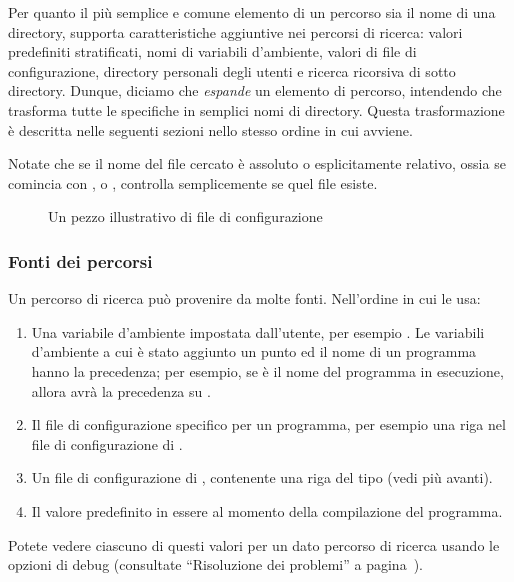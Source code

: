 \documentclass{article}
\begin{document}
Per quanto il più semplice e comune elemento di un percorso sia il nome di
una directory, \KPS{} supporta caratteristiche aggiuntive nei percorsi di
ricerca: valori predefiniti stratificati, nomi di variabili
d'ambiente, valori di file di configurazione, directory personali degli
utenti e ricerca ricorsiva di sotto directory. Dunque, diciamo che \KPS{}
\emph{espande} un elemento di percorso, intendendo che trasforma tutte le
specifiche in semplici nomi di directory. Questa trasformazione è
descritta nelle seguenti sezioni nello stesso ordine in cui avviene.

Notate che se il nome del file cercato è assoluto o esplicitamente relativo,
ossia se comincia con \samp{/},  o , \KPS{} controlla
semplicemente se quel file esiste.

\ifSingleColumn
\else
\begin{figure*}

\setlength{\abovecaptionskip}{0pt}
  \caption{Un pezzo illustrativo di file di configurazione}
  \label{fig:config-sample}
\end{figure*}
\fi

\subsubsection{Fonti dei percorsi}
\label{sec:path-sources}

Un percorso di ricerca può provenire da molte fonti. Nell'ordine in cui
\KPS{} le usa:

\begin{enumerate}
\item
  Una variabile d'ambiente impostata dall'utente, per esempio
  \@. Le variabili d'ambiente a cui è stato aggiunto un
  punto ed il nome di un programma hanno la precedenza; per esempio, se
   è il nome del programma in esecuzione, allora
   avrà la precedenza su .
\item
  Il file di configurazione specifico per un programma, per esempio una
  riga  nel file di configurazione  di
  .
\item
  Un file di configurazione  di \KPS, contenente una riga
  del tipo  (vedi più avanti).
\item Il valore predefinito in essere al momento della compilazione del 
  programma.
\end{enumerate}
\noindent Potete vedere ciascuno di questi valori per un dato percorso di
ricerca usando le opzioni di debug (consultate ``Risoluzione dei
problemi'' a pagina~\pageref{sec:debugging}).
\end{document}
